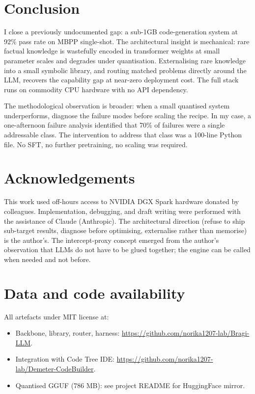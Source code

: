 \documentclass[11pt,a4paper]{article}
\begin{document}
\section{Conclusion}

I close a previously undocumented gap: a sub-1GB code-generation system at 92\% pass rate on MBPP single-shot. The architectural insight is mechanical: rare factual knowledge is wastefully encoded in transformer weights at small parameter scales and degrades under quantisation. Externalising rare knowledge into a small symbolic library, and routing matched problems directly around the LLM, recovers the capability gap at near-zero deployment cost. The full stack runs on commodity CPU hardware with no API dependency.

The methodological observation is broader: when a small quantised system underperforms, diagnose the failure modes before scaling the recipe. In my case, a one-afternoon failure analysis identified that 70\% of failures were a single addressable class. The intervention to address that class was a 100-line Python file. No SFT, no further pretraining, no scaling was required.

\section*{Acknowledgements}

This work used off-hours access to NVIDIA DGX Spark hardware donated by colleagues. Implementation, debugging, and draft writing were performed with the assistance of Claude (Anthropic). The architectural direction (refuse to ship sub-target results, diagnose before optimising, externalise rather than memorise) is the author's. The intercept-proxy concept emerged from the author's observation that LLMs do not have to be glued together; the engine can be called when needed and not before.

\section*{Data and code availability}

All artefacts under MIT license at:
\begin{itemize}
\item Backbone, library, router, harness: \url{https://github.com/norika1207-lab/Bragi-LLM}.
\item Integration with Code Tree IDE: \url{https://github.com/norika1207-lab/Demeter-CodeBuilder}.
\item Quantised GGUF (786 MB): see project README for HuggingFace mirror.
\end{itemize}
\end{document}
